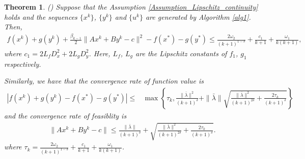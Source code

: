 \documentclass{article}
\numberwithin{equation}{section}
\newtheorem{theorem}{Theorem}[section]
\begin{document}
\begin{theorem}
    () Suppose that the Assumption \ref{Assumption_Lipschitz_continuity} holds and the sequences 
    $\{x^k\}$, $\{y^k\}$ and $\{u^k\}$ are generated by Algorithm \ref{alg1}. Then, 
    \begin{align}
        f(x^{k}) + g(y^{k}) +\frac{\beta_{k-1}}{2}\|Ax^k+By^k-c\rVert^2 - f(x^*) -g(y^*)  
        \leq \frac{2\omega_2}{(k+1)^{1-\delta}} +\frac{c_1}{k+1} +\frac{\omega_1}{k(k+1)}, 
    \end{align}
    where $c_1 = 2L_fD_x^2+ 2L_gD_y^2$. Here, $L_f$, $L_g$ are the Lipschitz constants of $f_1$, $g_1$ respectively. 
    
    Similarly, we have that the convergence rate of function value is 
    \begin{align}
        \left|f(x^k)+ g(y^k) -f(x^*)-g(y^*) \right|
        \leq & \max\left\{ \tau_k, \frac{\|\bar{\lambda}\rVert^2}{(k+1)^{\delta}} + \|\bar{\lambda}\rVert\sqrt{\frac{\|\bar{\lambda}\rVert^2}{(k+1)^{2\delta}}+\frac{2\tau_k}{(k+1)^{\delta}}} \right\}
    \end{align}
    and the convergence rate of feasiblity is  
    \begin{align}
        \|Ax^k+By^k-c\rVert \leq \frac{\|\bar{\lambda}\rVert}{(k+1)^{\delta}} + \sqrt{\frac{\|\bar{\lambda}\rVert^2}{(k+1)^{2\delta}}+\frac{2\tau_k}{(k+1)^{\delta}}}. 
    \end{align}
    where $\tau_k = \frac{2\omega_2}{(k+1)^{1-\delta}} +\frac{c_1}{k+1} +\frac{\omega_1}{k(k+1)}$. 
\end{theorem}
\end{document}
